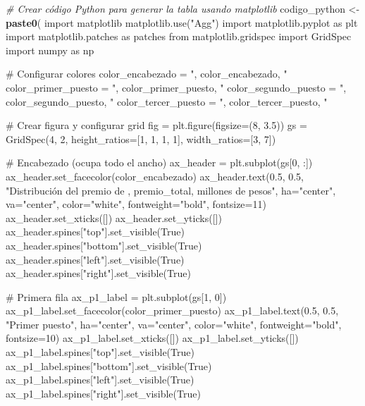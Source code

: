 \documentclass[
]{article}
\newenvironment{Shaded}{\begin{snugshade}}{\end{snugshade}}
\newcommand{\CommentTok}[1]{\textcolor[rgb]{0.56,0.35,0.01}{\textit{#1}}}
\newcommand{\FunctionTok}[1]{\textcolor[rgb]{0.13,0.29,0.53}{\textbf{#1}}}
\newcommand{\NormalTok}[1]{#1}
\newcommand{\OtherTok}[1]{\textcolor[rgb]{0.56,0.35,0.01}{#1}}
\newcommand{\StringTok}[1]{\textcolor[rgb]{0.31,0.60,0.02}{#1}}
\begin{document}
\begin{Shaded}
\begin{Highlighting}[]
\CommentTok{\# Crear código Python para generar la tabla usando matplotlib}
\NormalTok{codigo\_python }\OtherTok{\textless{}{-}} \FunctionTok{paste0}\NormalTok{(}\StringTok{\textquotesingle{}}
\StringTok{import matplotlib}
\StringTok{matplotlib.use("Agg")}
\StringTok{import matplotlib.pyplot as plt}
\StringTok{import matplotlib.patches as patches}
\StringTok{from matplotlib.gridspec import GridSpec}
\StringTok{import numpy as np}

\StringTok{\# Configurar colores}
\StringTok{color\_encabezado = "\textquotesingle{}}\NormalTok{, color\_encabezado, }\StringTok{\textquotesingle{}"}
\StringTok{color\_primer\_puesto = "\textquotesingle{}}\NormalTok{, color\_primer\_puesto, }\StringTok{\textquotesingle{}"}
\StringTok{color\_segundo\_puesto = "\textquotesingle{}}\NormalTok{, color\_segundo\_puesto, }\StringTok{\textquotesingle{}"}
\StringTok{color\_tercer\_puesto = "\textquotesingle{}}\NormalTok{, color\_tercer\_puesto, }\StringTok{\textquotesingle{}"}

\StringTok{\# Crear figura y configurar grid}
\StringTok{fig = plt.figure(figsize=(8, 3.5))}
\StringTok{gs = GridSpec(4, 2, height\_ratios=[1, 1, 1, 1], width\_ratios=[3, 7])}

\StringTok{\# Encabezado (ocupa todo el ancho)}
\StringTok{ax\_header = plt.subplot(gs[0, :])}
\StringTok{ax\_header.set\_facecolor(color\_encabezado)}
\StringTok{ax\_header.text(0.5, 0.5, "Distribución del premio de \textquotesingle{}}\NormalTok{, premio\_total, }\StringTok{\textquotesingle{} millones de pesos",}
\StringTok{              ha="center", va="center", color="white", fontweight="bold", fontsize=11)}
\StringTok{ax\_header.set\_xticks([])}
\StringTok{ax\_header.set\_yticks([])}
\StringTok{ax\_header.spines["top"].set\_visible(True)}
\StringTok{ax\_header.spines["bottom"].set\_visible(True)}
\StringTok{ax\_header.spines["left"].set\_visible(True)}
\StringTok{ax\_header.spines["right"].set\_visible(True)}

\StringTok{\# Primera fila}
\StringTok{ax\_p1\_label = plt.subplot(gs[1, 0])}
\StringTok{ax\_p1\_label.set\_facecolor(color\_primer\_puesto)}
\StringTok{ax\_p1\_label.text(0.5, 0.5, "Primer puesto", ha="center", va="center", color="white", fontweight="bold", fontsize=10)}
\StringTok{ax\_p1\_label.set\_xticks([])}
\StringTok{ax\_p1\_label.set\_yticks([])}
\StringTok{ax\_p1\_label.spines["top"].set\_visible(True)}
\StringTok{ax\_p1\_label.spines["bottom"].set\_visible(True)}
\StringTok{ax\_p1\_label.spines["left"].set\_visible(True)}
\StringTok{ax\_p1\_label.spines["right"].set\_visible(True)}


\end{Highlighting}
\end{Shaded}
\end{document}
